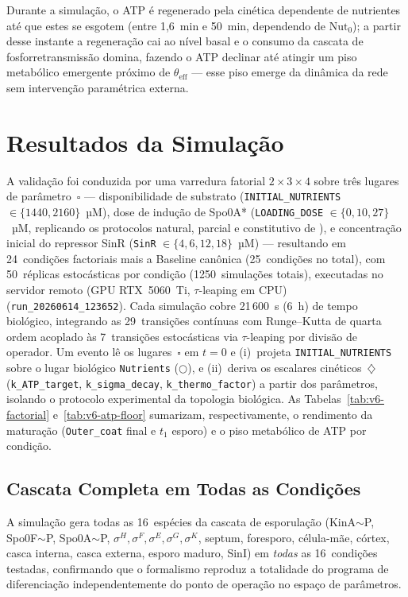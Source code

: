 Durante a simulação, o ATP é regenerado pela cinética dependente de
nutrientes até que estes se esgotem (entre 1{,}6~min e 50~min,
dependendo de $\text{Nut}_0$); a partir desse instante a regeneração cai
ao nível basal e o consumo da cascata de fosforretransmissão domina,
fazendo o ATP declinar até atingir um piso metabólico emergente próximo de
$\theta_{\text{eff}}$ --- esse piso emerge da dinâmica da rede
sem intervenção paramétrica externa.

\section{Resultados da Simulação}
\label{sec:resultados}

A validação foi conduzida por uma varredura fatorial $2 \times 3 \times 4$
sobre três lugares de parâmetro~$\square$ — disponibilidade de substrato
(\texttt{INITIAL\_NUTRIENTS} $\in \{1440, 2160\}$~µM), dose de indução de
Spo0A* (\texttt{LOADING\_DOSE} $\in \{0, 10, 27\}$~µM, replicando os
protocolos natural, parcial e constitutivo de \textcite{Fujita2005}), e
concentração inicial do repressor SinR
(\texttt{SinR} $\in \{4, 6, 12, 18\}$~µM) —
resultando em 24~condições factoriais mais a Baseline canônica
(25~condições no total), com 50~réplicas estocásticas por condição
(1250~simulações totais), executadas no servidor remoto
(GPU RTX~5060~Ti, $\tau$-leaping em CPU)
(\texttt{run\_20260614\_123652}).
Cada simulação cobre 21\,600~s (6~h) de tempo biológico, integrando as
29~transições contínuas com Runge--Kutta de quarta ordem acoplado
às 7~transições estocásticas via $\tau$-leaping por divisão de operador.
Um evento lê os lugares~$\square$ em $t=0$ e (i)~projeta
\texttt{INITIAL\_NUTRIENTS} sobre o lugar biológico \texttt{Nutrients}
($\bigcirc$), e (ii)~deriva os escalares cinéticos~$\diamondsuit$
(\texttt{k\_ATP\_target}, \texttt{k\_sigma\_decay},
\texttt{k\_thermo\_factor}) a partir dos parâmetros, isolando o protocolo
experimental da topologia biológica.
As Tabelas~\ref{tab:v6-factorial} e~\ref{tab:v6-atp-floor} sumarizam,
respectivamente, o rendimento da maturação (\texttt{Outer\_coat} final
e $t_1$ esporo) e o piso metabólico de ATP por condição.

\subsection{Cascata Completa em Todas as Condições}
\label{sec:cascata-completa}

A simulação gera todas as 16~espécies da cascata de esporulação
(KinA${\sim}$P, Spo0F${\sim}$P, Spo0A${\sim}$P, $\sigma^H, \sigma^F,
\sigma^E, \sigma^G, \sigma^K$, septum, foresporo, célula-mãe, córtex,
casca interna, casca externa, esporo maduro, SinI) em \emph{todas} as 16~condições testadas, confirmando
que o formalismo reproduz a totalidade do programa de diferenciação
independentemente do ponto de operação no espaço de parâmetros.

